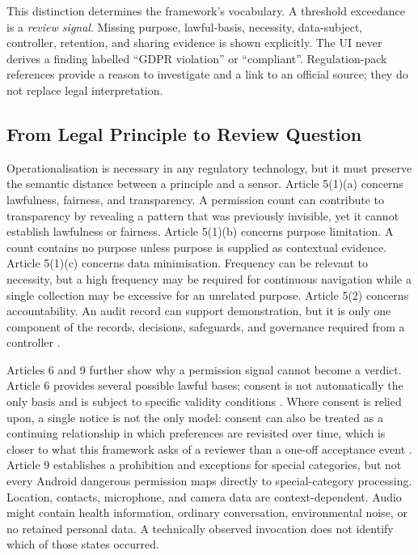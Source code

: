 This distinction determines the framework's vocabulary. A threshold exceedance is a \emph{review signal}. Missing purpose, lawful-basis, necessity, data-subject, controller, retention, and sharing evidence is shown explicitly. The UI never derives a finding labelled ``GDPR violation'' or ``compliant''. Regulation-pack references provide a reason to investigate and a link to an official source; they do not replace legal interpretation.

\subsection{From Legal Principle to Review Question}

Operationalisation is necessary in any regulatory technology, but it must preserve the semantic distance between a principle and a sensor. Article 5(1)(a) concerns lawfulness, fairness, and transparency. A permission count can contribute to transparency by revealing a pattern that was previously invisible, yet it cannot establish lawfulness or fairness. Article 5(1)(b) concerns purpose limitation. A count contains no purpose unless purpose is supplied as contextual evidence. Article 5(1)(c) concerns data minimisation. Frequency can be relevant to necessity, but a high frequency may be required for continuous navigation while a single collection may be excessive for an unrelated purpose. Article 5(2) concerns accountability. An audit record can support demonstration, but it is only one component of the records, decisions, safeguards, and governance required from a controller \cite{gdpr2016}.

Articles 6 and 9 further show why a permission signal cannot become a verdict. Article 6 provides several possible lawful bases; consent is not automatically the only basis and is subject to specific validity conditions \cite{edpbconsent2020}. Where consent is relied upon, a single notice is not the only model: consent can also be treated as a continuing relationship in which preferences are revisited over time, which is closer to what this framework asks of a reviewer than a one-off acceptance event \cite{kaye2015}. Article 9 establishes a prohibition and exceptions for special categories, but not every Android dangerous permission maps directly to special-category processing. Location, contacts, microphone, and camera data are context-dependent. Audio might contain health information, ordinary conversation, environmental noise, or no retained personal data. A technically observed invocation does not identify which of those states occurred.

